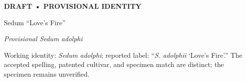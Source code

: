 \begin{minipage}[t][3.30in][t]{3.36in}
\vspace{0pt}
{\color{rust}\sffamily\bfseries\fontsize{9}{11}\selectfont DRAFT • PROVISIONAL IDENTITY}\par\vspace{8pt}
{\raggedright\fontsize{28}{30}\selectfont Sedum “Love’s Fire”\par}\vspace{7pt}
{\itshape\fontsize{15}{18}\selectfont Provisional \textit{Sedum adolphi}}\par\vspace{10pt}
{\sffamily\fontsize{9.5}{12}\selectfont Working identity: \textit{Sedum adolphi}; reported label: “\textit{S. adolphii} ‘Love’s Fire’.” The accepted spelling, patented cultivar, and specimen match are distinct; the specimen remains unverified.}
\end{minipage}\hfill
\begin{minipage}[t][3.30in][t]{3.30in}\vspace{0pt}\AssetHero\end{minipage}\par
\AssetDetails
\vspace{.05in}

